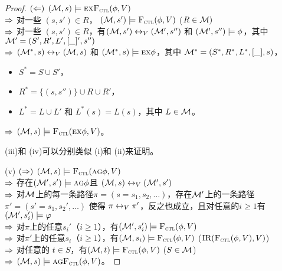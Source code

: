 \begin{proof}
	$(\Leftarrow)$ $({\cal M},s)\models\textsc{e} \textsc{x}{\textsc{F}_{\textsc{ctl}}}(\phi,V)$\\
	$\Rightarrow$ 对一些 $(s,s')\in R$， $({\cal M},s')\models{\textsc{F}_{\textsc{ctl}}}(\phi,V)$ ($R\in {\cal M})$\\
	$\Rightarrow$ 对一些 $(s,s')\in R$，有$({\cal M},s')\leftrightarrow_V({\cal M}',s'')$ 和 $({\cal M}',s'')\models\phi$，其中 ${\cal M}'=(S',R',L',[\_]',s'')$ \\
	$\Rightarrow$ $({\cal M}^*,s)\leftrightarrow_V({\cal M},s)$ 和 $({\cal M}^*,s)\models\textsc{e}\textsc{x}\phi$，其中
	${\cal M}^*=(S^*,R^*,L^*,[\_], s)$，
	\begin{itemize}
		\item $S^*=S\cup S'$，
		\item $R^*=\{(s,s'')\}\cup R \cup R'$，
		\item $L^*= L \cup L'$ 和 $L^*(s)=L(s)$，其中 $L\in{\cal M}$。
	\end{itemize}
	$\Rightarrow$ $({\cal M},s)\models {\textsc{F}_{\textsc{ctl}}}(\textsc{e}\textsc{x}\phi,V)$。
	
	
	
	
	(iii)和 (iv)可以分别类似 (i)和 (ii)来证明。
	
	(v) $(\Rightarrow)$ $({\cal M},s) \models {\textsc{F}_{\textsc{ctl}}}(\textsc{a} \textsc{g} \phi, V)$\\
	$\Rightarrow$ 存在$({\cal M}',s') \models \textsc{a} \textsc{g} \phi$且 $({\cal M},s) \leftrightarrow_V ({\cal M}',s')$\\
	$\Rightarrow$ 对${\cal M}$上的每一条路径$\pi=(s=s_1, s_2, \dots)$，存在${\cal M}'$上的一条路径$\pi'=(s'=s_1, s_2', \dots)$ 使得 $\pi \leftrightarrow_V \pi'$，反之也成立，且对任意的$i\geq 1$有 $({\cal M}', s_i') \models \varphi$\\ 
	$\Rightarrow$ 对$\pi$上的任意$s_i'$（$i\geq 1$），有$({\cal M}',s_i') \models {\textsc{F}_{\textsc{ctl}}}(\phi, V)$\\
	$\Rightarrow$ 对$\pi'$上的任意$s_i$（$i\geq 1$），有$({\cal M},s_i) \models {\textsc{F}_{\textsc{ctl}}}(\phi, V)$ \hfill ($\textrm{IR}({\textsc{F}_{\textsc{ctl}}}(\phi, V), V)$)\\
	$\Rightarrow$ 对任意的 $t \in S$，有$({\cal M},t) \models {\textsc{F}_{\textsc{ctl}}}(\phi, V)$ \quad ($S\in {\cal M}$)\\
	$\Rightarrow$ $({\cal M},s) \models \textsc{a} \textsc{g} {\textsc{F}_{\textsc{ctl}}}(\phi, V)$。
	

\end{proof}
